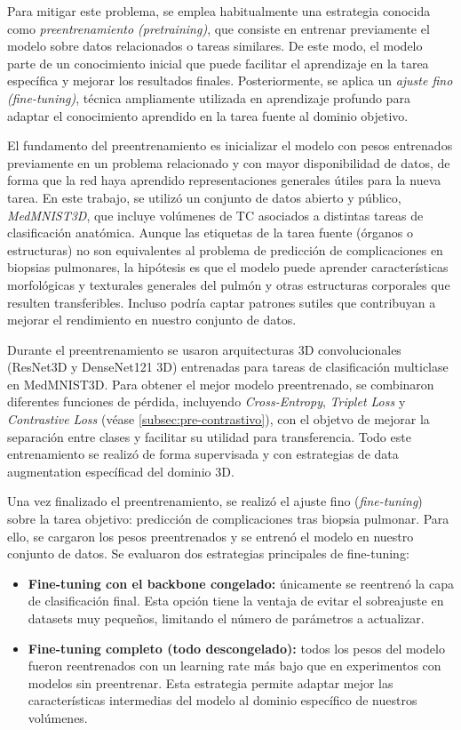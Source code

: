 Para mitigar este problema, se emplea habitualmente una estrategia conocida como \textit{preentrenamiento (pretraining)}, que consiste en entrenar previamente el modelo sobre datos relacionados o tareas similares. De este modo, el modelo parte de un conocimiento inicial que puede facilitar el aprendizaje en la tarea específica y mejorar los resultados finales. Posteriormente, se aplica un \textit{ajuste fino (fine-tuning)}, técnica ampliamente utilizada en aprendizaje profundo para adaptar el conocimiento aprendido en la tarea fuente al dominio objetivo.

El fundamento del preentrenamiento es inicializar el modelo con pesos entrenados previamente en un problema relacionado y con mayor disponibilidad de datos, de forma que la red haya aprendido representaciones generales útiles para la nueva tarea. En este trabajo, se utilizó un conjunto de datos abierto y público, \textit{MedMNIST3D}, que incluye volúmenes de TC asociados a distintas tareas de clasificación anatómica. Aunque las etiquetas de la tarea fuente (órganos o estructuras) no son equivalentes al problema de predicción de complicaciones en biopsias pulmonares, la hipótesis es que el modelo puede aprender características morfológicas y texturales generales del pulmón y otras estructuras corporales que resulten transferibles. Incluso podría captar patrones sutiles que contribuyan a mejorar el rendimiento en nuestro conjunto de datos.

Durante el preentrenamiento se usaron arquitecturas 3D convolucionales (ResNet3D y DenseNet121 3D) entrenadas para tareas de clasificación multiclase en MedMNIST3D. Para obtener el mejor modelo preentrenado, se combinaron diferentes funciones de pérdida, incluyendo \textit{Cross-Entropy}, \textit{Triplet Loss} y \textit{Contrastive Loss} (véase \ref{subsec:pre-contrastivo}), con el objetvo de mejorar la separación entre clases y facilitar su utilidad para transferencia. Todo este entrenamiento se realizó de forma supervisada y con estrategias de data augmentation específicad del dominio 3D.

Una vez finalizado el preentrenamiento, se realizó el ajuste fino (\textit{fine-tuning}) sobre la tarea objetivo: predicción de complicaciones tras biopsia pulmonar. Para ello, se cargaron los pesos preentrenados y se entrenó el modelo en nuestro conjunto de datos. Se evaluaron dos estrategias principales de fine-tuning:

\begin{itemize}
    \item \textbf{Fine-tuning con el backbone congelado:} únicamente se reentrenó la capa de clasificación final. Esta opción tiene la ventaja de evitar el sobreajuste en datasets muy pequeños, limitando el número de parámetros a actualizar.
    \item \textbf{Fine-tuning completo (todo descongelado):} todos los pesos del modelo fueron reentrenados con un learning rate más bajo que en experimentos con modelos sin preentrenar. Esta estrategia permite adaptar mejor las características intermedias del modelo al dominio específico de nuestros volúmenes.
\end{itemize}

